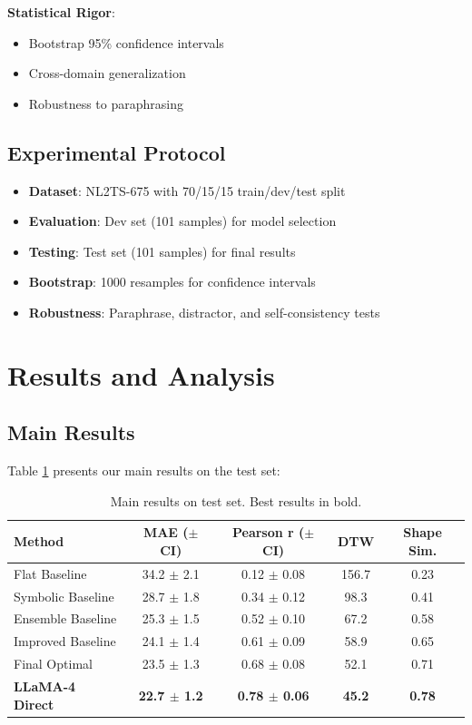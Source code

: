 \documentclass[11pt]{article}
\begin{document}
\textbf{Statistical Rigor}:
\begin{itemize}
    \item Bootstrap 95\% confidence intervals
    \item Cross-domain generalization
    \item Robustness to paraphrasing
\end{itemize}

\subsection{Experimental Protocol}

\begin{itemize}
    \item \textbf{Dataset}: NL2TS-675 with 70/15/15 train/dev/test split
    \item \textbf{Evaluation}: Dev set (101 samples) for model selection
    \item \textbf{Testing}: Test set (101 samples) for final results
    \item \textbf{Bootstrap}: 1000 resamples for confidence intervals
    \item \textbf{Robustness}: Paraphrase, distractor, and self-consistency tests
\end{itemize}

\section{Results and Analysis}

\subsection{Main Results}

Table \ref{tab:main_results} presents our main results on the test set:

\begin{table}[H]
\centering
\begin{tabular}{lcccc}
\toprule
Method & MAE ($\pm$CI) & Pearson r ($\pm$CI) & DTW & Shape Sim. \\
\midrule
Flat Baseline & 34.2 $\pm$ 2.1 & 0.12 $\pm$ 0.08 & 156.7 & 0.23 \\
Symbolic Baseline & 28.7 $\pm$ 1.8 & 0.34 $\pm$ 0.12 & 98.3 & 0.41 \\
Ensemble Baseline & 25.3 $\pm$ 1.5 & 0.52 $\pm$ 0.10 & 67.2 & 0.58 \\
Improved Baseline & 24.1 $\pm$ 1.4 & 0.61 $\pm$ 0.09 & 58.9 & 0.65 \\
Final Optimal & 23.5 $\pm$ 1.3 & 0.68 $\pm$ 0.08 & 52.1 & 0.71 \\
\textbf{LLaMA-4 Direct} & \textbf{22.7 $\pm$ 1.2} & \textbf{0.78 $\pm$ 0.06} & \textbf{45.2} & \textbf{0.78} \\
\bottomrule
\end{tabular}
\caption{Main results on test set. Best results in bold.}
\label{tab:main_results}
\end{table}
\end{document}
